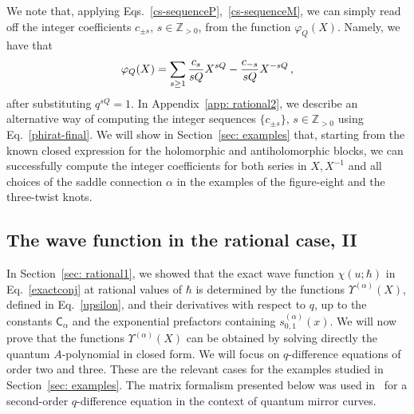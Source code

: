 \documentclass[a4paper,11pt]{article}
\theoremstyle{definition}
\def\IZ{{\mathbb Z}}
\newcommand{\mC}{\mathsf{C}}
\newcommand{\be}{\begin{equation}}
\newcommand{\ee}{\end{equation}}
\begin{document}
We note that, applying Eqs.~\eqref{cs-sequenceP},~\eqref{cs-sequenceM}, we can simply read off the integer coefficients $c_{\pm s}$, $s \in \IZ_{>0}$, from the function $\varphi_Q(X)$. Namely, we have that
%
\be \label{varphiQ-cs}
\varphi_Q(X)=\sum_{s \ge 1} {c_s \over sQ} X^{sQ} - {c_{-s} \over sQ} X^{-sQ} \, ,
\ee
after substituting $q^{sQ}=1$. 
In Appendix~\ref{app: rational2}, we describe an alternative way of computing the integer sequences $\{ c_{\pm s} \}$, $s \in \IZ_{>0}$ using Eq.~\eqref{phirat-final}.
We will show in Section~\ref{sec: examples} that, starting from the known closed expression for the holomorphic and antiholomorphic blocks, we can successfully compute the integer coefficients for both series in $X, X^{-1}$ and all choices of the saddle connection $\alpha$ in the examples of the figure-eight and the three-twist knots. 

\subsection{The wave function in the rational case, II} \label{sec: rational3}
In Section~\ref{sec: rational1}, we showed that the exact wave function $\chi(u; \hbar)$ in Eq.~\eqref{exactconj} at rational values of $\hbar$ is determined by the functions $\Upsilon^{(\alpha)} (X)$, defined in Eq.~\eqref{upsilon}, and their derivatives with respect to $q$, up to the constants $\mC_\alpha$ and the exponential prefactors containing $s^{(\alpha)}_{0,1}(x)$. We will now prove that the functions $\Upsilon^{(\alpha)} (X)$ can be obtained by solving directly the quantum $A$-polynomial in closed form. We will focus on $q$-difference equations of order two and three. These are the relevant cases for the examples studied in Section~\ref{sec: examples}. The matrix formalism presented below was used in~\cite{szabolcs} for a second-order $q$-difference equation in the context of quantum mirror curves.
\end{document}
